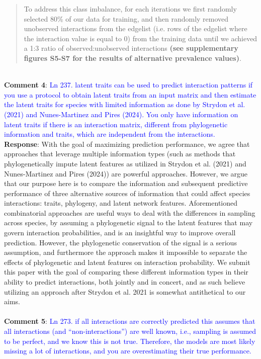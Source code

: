 \documentclass{article}
\begin{document}
\begin{quote}
        To address this class imbalance, for each iterations we first randomly selected 80\% of our data for training, and then randomly removed unobserved interactions from the edgelist (i.e. rows of the edgelist where the interaction value is equal to 0) from the training data until we achieved a 1:3 ratio of observed:unobserved interactions \textbf{(see supplementary figures S5-S7 for the results of alternative prevalence values)}.
\end{quote}
\\


    \textbf{Comment 4}: \textcolor{blue}{Ln 237. latent traits can be used to predict interaction patterns if you use a protocol to obtain latent traits from an input matrix and then estimate the latent traits for species with limited information as done by Strydon et al. (2021) and Nunes-Martinez and Pires (2024). You only have information on latent traits if there is an interaction matrix, different from phylogenetic information and traits, which are independent from the interactions.}
    \\
  \textbf{Response}: With the goal of maximizing prediction performance, we agree that approaches that leverage multiple information types (such as methods that phylogenetically impute latent features as utilized in Strydon et al. (2021) and Nunes-Martinez and Pires (2024)) are powerful approaches. However, we argue that our purpose here is to compare the information and subsequent predictive performance of three  alternative sources of information that could affect species interactions: traits, phylogeny, and latent network features. Aforementioned combinatorial approaches are useful ways to deal with the differences in sampling across species, by assuming a phylogenetic signal to the latent features that may govern interaction probabilities, and is an insightful way to improve overall prediction. However, the phylogenetic conservation of the signal is a serious assumption, and furthermore the approach makes it impossible to separate the effects of phylogenetic and latent features on interaction probability. We submit this paper with the goal of comparing these different information types in their ability to predict interactions, both jointly and in concert, and as such believe utilizing an approach after Strydon et al. 2021 is somewhat antithetical to our aims. 
    \\
    \\
    \textbf{Comment 5}: \textcolor{blue}{Ln 273. if all interactions are correctly predicted this assumes that all interactions (and “non-interactions”) are well known, i.e., sampling is assumed to be perfect, and we know this is not true. Therefore, the models are most likely missing a lot of interactions, and you are overestimating their true performance.}
\end{document}
